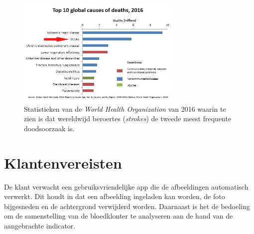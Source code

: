 \documentclass[a4paper,kulak]{kulakarticle}
\begin{document}
\begin{figure}[H]
	\centering
	\includegraphics[width = 0.7\textwidth]{top10doodsoorzaken.png}
	
	\caption{Statistieken van de \textit{World Health Organization} van 2016 waarin te zien is dat wereldwijd beroertes (\textit{strokes}) de tweede meest frequente doodsoorzaak is.}
	\label{figuur doodsoorzaken}
\end{figure}

\tableofcontents

\section{Klantenvereisten}
De klant verwacht een gebruiksvriendelijke app die de afbeeldingen automatisch verwerkt. Dit houdt in dat een afbeelding ingeladen kan worden, de foto bijgesneden en de achtergrond verwijderd worden. Daarnaast is het de bedoeling om de samenstelling van de bloedklonter te analyseren aan de hand van de aangebrachte indicator.
\end{document}
